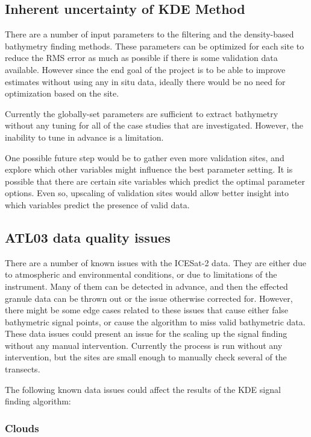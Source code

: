 \subsection{Inherent uncertainty of KDE Method}
There are a number of input parameters to the filtering and the density-based bathymetry finding methods. These parameters can be optimized for each site to reduce the RMS error as much as possible if there is some validation data available. However since the end goal of the project is to be able to improve estimates without using any in situ data, ideally there would be no need for optimization based on the site.

Currently the globally-set parameters are sufficient to extract bathymetry without any tuning for all of the case studies that are investigated. However, the inability to tune in advance is a limitation. 

One possible future step would be to gather even more validation sites, and explore which other variables might influence the best parameter setting. It is possible that there are certain site variables which predict the optimal parameter options. Even so, upscaling of validation sites would allow better insight into which variables predict the presence of valid data.  

\subsection{ATL03 data quality issues}\label{sec:discussion-photon-issues}

There are a number of known issues with the ICESat-2 data. They are either due to atmospheric and environmental conditions, or due to limitations of the instrument. Many of them can be detected in advance, and then the effected granule data can be thrown out or the issue otherwise corrected for. However, there might be some edge cases related to these issues that cause either false bathymetric signal points, or cause the algorithm to miss valid bathymetric data. These data issues could present an issue for the scaling up the signal finding without any manual intervention. Currently the process is run without any intervention, but the sites are small enough to manually check several of the transects.

The following known data issues could affect the results of the KDE signal finding algorithm:

\subsubsection{Clouds}

